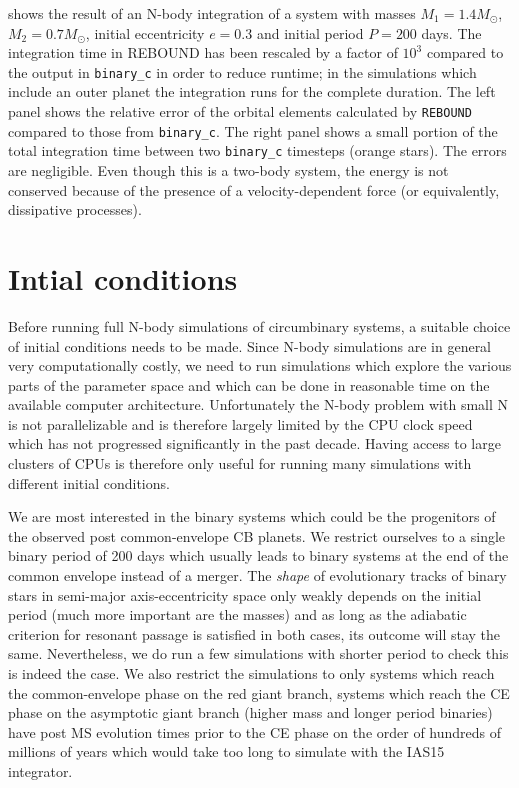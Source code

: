 \documentclass[twoside,openright,titlepage,numbers=noenddot,headinclude,%
                footinclude=true,cleardoublepage=empty,abstractoff, 
                BCOR=5mm,paper=a4,fontsize=11pt,%
                american,%
                ]{scrreprt}%
\begin{document}
shows the result of an N-body integration of a system with masses $M_1=1.4 M_\odot$,
$M_2=0.7 M_\odot$, initial eccentricity $e=0.3$ and initial period $P=200$ days. 
The integration time in REBOUND has been rescaled by a factor of $10^3$ compared to 
the output in \texttt{binary\_c} in order to reduce runtime; in the simulations which
include an outer planet the integration runs for the complete duration.
The left panel shows the relative error of the orbital elements calculated by
\texttt{REBOUND} compared to those from \texttt{binary\_c}. The right panel shows a 
small portion of the total integration time between two \texttt{binary\_c}
timesteps (orange stars). The errors are negligible. Even though this is a
two-body system, the energy is not conserved because of the presence of a 
velocity-dependent force (or equivalently, dissipative processes). 

\section{Intial conditions}
\label{sec:initial_conditions}
Before running full N-body simulations of circumbinary systems, a suitable choice
of initial conditions needs to be made. Since N-body simulations are in general very
computationally costly, we need to run simulations which explore the various parts
of the parameter space and which can be done in reasonable time on the available 
computer architecture. Unfortunately the N-body problem with small N is not 
parallelizable and is therefore largely limited by the CPU clock speed which has not
progressed significantly in the past decade. Having access to large clusters 
of CPUs is therefore only useful for running many simulations with different 
initial conditions.

We are most interested in the binary systems which could be the progenitors of
the observed post common-envelope CB planets. We restrict ourselves to a single
binary period of 200 days which usually leads to binary systems at the end
of the common envelope instead of a merger. 
The \emph{shape}  of evolutionary tracks of binary stars in semi-major axis-eccentricity 
space only weakly depends on the initial period (much more 
important are the masses)
and as long as the adiabatic criterion for resonant passage is satisfied 
in both cases,
its outcome will stay the same. Nevertheless, we do run a few simulations with
shorter period to check this is indeed the case. We also restrict the simulations 
to only systems which reach the common-envelope phase on the red giant branch,
systems which reach the CE phase on the asymptotic giant branch (higher mass and
longer period binaries) have post MS evolution times prior to the CE phase
on the order of hundreds of millions of years which would take too long to simulate
with the IAS15 integrator.
\end{document}
